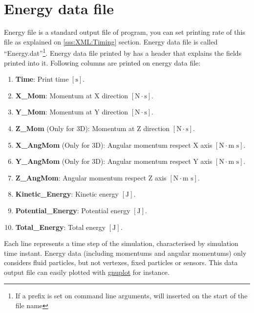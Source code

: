 \section{Energy data file}
\label{ss:running:energyoutput}
%
Energy file is a standard output file of \NAME program, you can set printing rate of this file
as explained on \ref{sss:XML:Timing} section. Energy data file is called ``Energy.dat''\footnote{If
a prefix is set on command line arguments, will inserted on the start of the file name}.\rc
%
Energy data file printed by \NAME has a header that explains the fields printed into it. Following
columns are printed on energy data file:
%
\begin{enumerate}
	\item \textbf{Time}: Print time $[\mbox{s}]$.
	\item \textbf{X\_Mom}: Momentum at X direction $[\mbox{N} \cdot \mbox{s}]$.
	\item \textbf{Y\_Mom}: Momentum at Y direction $[\mbox{N} \cdot \mbox{s}]$.
	\item \textbf{Z\_Mom} (Only for 3D): Momentum at Z direction $[\mbox{N} \cdot \mbox{s}]$.
	\item \textbf{X\_AngMom} (Only for 3D): Angular momentum respect X axis $[\mbox{N} \cdot \mbox{m s}]$.
	\item \textbf{Y\_AngMom} (Only for 3D): Angular momentum respect Y axis $[\mbox{N} \cdot \mbox{m s}]$.
	\item \textbf{Z\_AngMom}: Angular momentum respect Z axis $[\mbox{N} \cdot \mbox{m s}]$.
	\item \textbf{Kinetic\_Energy}: Kinetic energy $[\mbox{J}]$.
	\item \textbf{Potential\_Energy}: Potential energy $[\mbox{J}]$.
	\item \textbf{Total\_Energy}: Total energy $[\mbox{J}]$.
\end{enumerate}
%
Each line represents a time step of the simulation, characterised by simulation time instant. Energy
data (including momentums and angular momentums) only considers fluid particles, but not vertexes,
fixed particles or sensors.\rc
%
This data output file can easily plotted with \href{http://www.gnuplot.info}{gnuplot} for instance.
%
